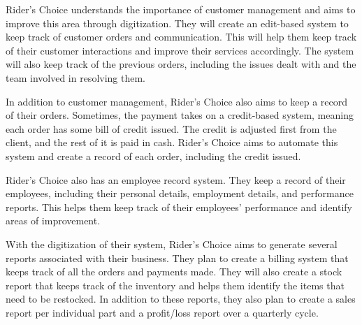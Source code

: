 Rider's Choice understands the importance of customer management and aims to improve this area through digitization. They will create an edit-based system to keep track of customer orders and communication. This will help them keep track of their customer interactions and improve their services accordingly. The system will also keep track of the previous orders, including the issues dealt with and the team involved in resolving them.

In addition to customer management, Rider's Choice also aims to keep a record of their orders. Sometimes, the payment takes on a credit-based system, meaning each order has some bill of credit issued. The credit is adjusted first from the client, and the rest of it is paid in cash. Rider's Choice aims to automate this system and create a record of each order, including the credit issued.

Rider's Choice also has an employee record system. They keep a record of their employees, including their personal details, employment details, and performance reports. This helps them keep track of their employees' performance and identify areas of improvement.

With the digitization of their system, Rider's Choice aims to generate several reports associated with their business. They plan to create a billing system that keeps track of all the orders and payments made. They will also create a stock report that keeps track of the inventory and helps them identify the items that need to be restocked. In addition to these reports, they also plan to create a sales report per individual part and a profit/loss report over a quarterly cycle.
\clearpage